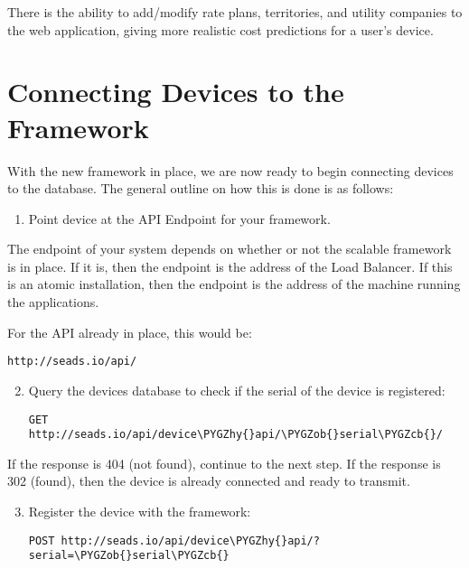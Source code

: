 \documentclass[letterpaper,10pt,english]{sphinxmanual}
\def\PYGZob{\char`\{}
\def\PYGZcb{\char`\}}
\def\PYGZhy{\char`\-}
\begin{document}
There is the ability to add/modify rate plans, territories, and utility companies to the web application, giving more realistic cost predictions for a user's device.


\section{Connecting Devices to the Framework}
\label{getting-started:connecting-devices-to-the-framework}
With the new framework in place, we are now ready to begin connecting devices to the database. The general outline on how this is done is as follows:
\begin{enumerate}
\item {} 
Point device at the API Endpoint for your framework.

\end{enumerate}

The endpoint of your system depends on whether or not the scalable framework is in place. If it is, then the endpoint is the address of the Load Balancer. If this is an atomic installation, then the endpoint is the address of the machine running the applications.

For the API already in place, this would be:

\begin{Verbatim}[commandchars=\\\{\}]
http://seads.io/api/
\end{Verbatim}
\begin{enumerate}
\setcounter{enumi}{1}
\item {} 
Query the devices database to check if the serial of the device is registered:

\begin{Verbatim}[commandchars=\\\{\}]
GET http://seads.io/api/device\PYGZhy{}api/\PYGZob{}serial\PYGZcb{}/
\end{Verbatim}

\end{enumerate}

If the response is 404 (not found), continue to the next step. If the response is 302 (found), then the device is already connected and ready to transmit.
\begin{enumerate}
\setcounter{enumi}{2}
\item {} 
Register the device with the framework:

\begin{Verbatim}[commandchars=\\\{\}]
POST http://seads.io/api/device\PYGZhy{}api/?serial=\PYGZob{}serial\PYGZcb{}
\end{Verbatim}

\end{enumerate}
\end{document}
